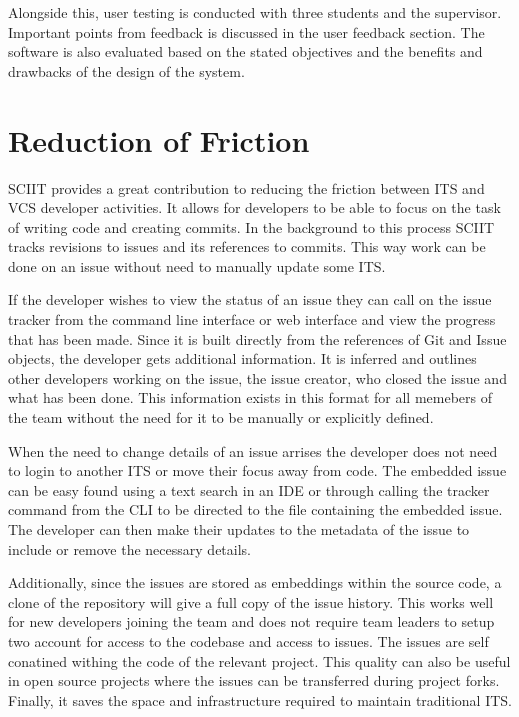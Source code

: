 \documentclass{mproj}
\begin{document}
Alongside this, user testing is conducted with three students and the supervisor. Important points from feedback is discussed in the user feedback section. The software is also evaluated based on the stated objectives and the benefits and drawbacks of the design of the system.


\section{Reduction of Friction}

SCIIT provides a great contribution to reducing the friction between ITS and VCS developer activities. It allows for developers to be able to focus on the task of writing code and creating commits. In the background to this process SCIIT tracks revisions to issues and its references to commits. This way work can be done on an issue without need to manually update some ITS.

If the developer wishes to view the status of an issue they can call on the issue tracker from the command line interface or web interface and view the progress that has been made. Since it is built directly from the references of Git and Issue objects, the developer gets additional information. It is inferred and outlines other developers working on the issue, the issue creator, who closed the issue and what has been done. This information exists in this format for all memebers of the team without the need for it to be manually or explicitly defined.

When the need to change details of an issue arrises the developer does not need to login to another ITS or move their focus away from code. The embedded issue can be easy found using a text search in an IDE or through calling the tracker command from the CLI to be directed to the file containing the embedded issue. The developer can then make their updates to the metadata of the issue to include or remove the necessary details.

Additionally, since the issues are stored as embeddings within the source code, a clone of the repository will give a full copy of the issue history. This works well for new developers joining the team and does not require team leaders to setup two account for access to the codebase and access to issues. The issues are self conatined withing the code of the relevant project. This quality can also be useful in open source projects where the issues can be transferred during project forks. Finally, it saves the space and infrastructure required to maintain traditional ITS. 
\end{document}
